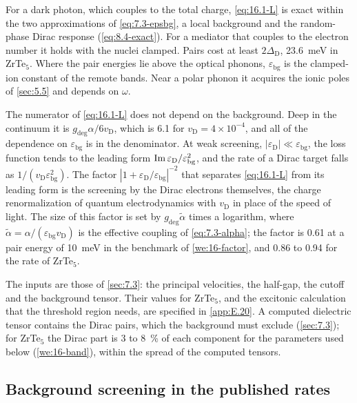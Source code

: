 \noindent For a dark photon, which couples to the total charge, \cref{eq:16.1-L} is exact within the two approximations of \cref{eq:7.3-epsbg}, a local background and the random-phase Dirac response (\cref{eq:8.4-exact}). For a mediator that couples to the electron number it holds with the nuclei clamped. Pairs cost at least $2\Delta_{\mathrm{D}}$, \SI{23.6}{meV} in ZrTe$_5$. Where the pair energies lie above the optical phonons, $\varepsilon_{\mathrm{bg}}$ is the clamped-ion constant of the remote bands. Near a polar phonon it acquires the ionic poles of \cref{sec:5.5} and depends on $\omega$.

The numerator of \cref{eq:16.1-L} does not depend on the background. Deep in the continuum it is $g_{\mathrm{deg}}\alpha/6v_{\mathrm{D}}$, which is 6.1 for $v_{\mathrm{D}} = 4\times10^{-4}$, and all of the dependence on $\varepsilon_{\mathrm{bg}}$ is in the denominator. At weak screening, $|\varepsilon_{\mathrm{D}}| \ll \varepsilon_{\mathrm{bg}}$, the loss function tends to the leading form $\operatorname{Im}\varepsilon_{\mathrm{D}}/\varepsilon_{\mathrm{bg}}^2$, and the rate of a Dirac target falls as $1/(v_{\mathrm{D}}\varepsilon_{\mathrm{bg}}^2)$. The factor $|1 + \varepsilon_{\mathrm{D}}/\varepsilon_{\mathrm{bg}}|^{-2}$ that separates \cref{eq:16.1-L} from its leading form is the screening by the Dirac electrons themselves, the charge renormalization of quantum electrodynamics with $v_{\mathrm{D}}$ in place of the speed of light. The size of this factor is set by $g_{\mathrm{deg}}\tilde\alpha$ times a logarithm, where $\tilde\alpha = \alpha/(\varepsilon_{\mathrm{bg}}v_{\mathrm{D}})$ is the effective coupling of \cref{eq:7.3-alpha}; the factor is 0.61 at a pair energy of \SI{10}{meV} in the benchmark of \cref{we:16-factor}, and 0.86 to 0.94 for the rate of ZrTe$_5$.

The inputs are those of \cref{sec:7.3}: the principal velocities, the half-gap, the cutoff and the background tensor. Their values for ZrTe$_5$, and the excitonic calculation that the threshold region needs, are specified in \cref{app:E.20}. A computed dielectric tensor contains the Dirac pairs, which the background must exclude (\cref{sec:7.3}); for ZrTe$_5$ the Dirac part is 3 to \SI{8}{\percent} of each component for the parameters used below (\cref{we:16-band}), within the spread of the computed tensors.

\subsection{Background screening in the published rates}\label{sec:16.1-published}

